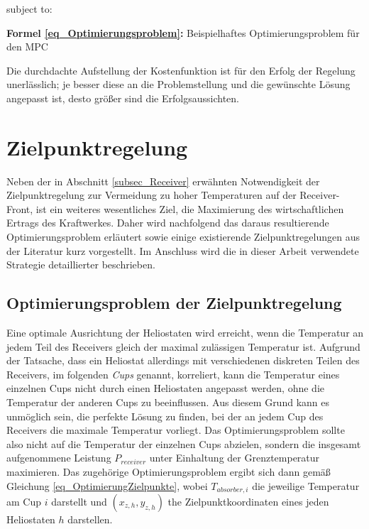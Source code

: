 \vspace*{-5.2\baselineskip}
\qquad subject to:
\vspace*{4.2\baselineskip}
\centerline{\small{\textsf{\textbf{Formel \ref{eq_Optimierungsproblem}:}} Beispielhaftes Optimierungsproblem für den MPC}}

Die durchdachte Aufstellung der Kostenfunktion ist für den Erfolg der Regelung unerlässlich; je besser diese an die Problemstellung und die gewünschte Lösung angepasst ist, desto größer sind die Erfolgsaussichten.


\section{Zielpunktregelung} \label{sec_Zielpunktregelung}
Neben der in Abschnitt \ref{subsec_Receiver} erwähnten Notwendigkeit der Zielpunktregelung zur Vermeidung zu hoher Temperaturen auf der Receiver-Front, ist ein weiteres wesentliches Ziel, die Maximierung des wirtschaftlichen Ertrags des Kraftwerkes.
Daher wird nachfolgend das daraus resultierende Optimierungsproblem erläutert sowie einige existierende Zielpunktregelungen aus der Literatur kurz vorgestellt.
Im Anschluss wird die in dieser Arbeit verwendete Strategie detaillierter beschrieben.

\subsection{Optimierungsproblem der Zielpunktregelung} \label{subsec_OptimierungZielpunkte}
Eine optimale Ausrichtung der Heliostaten wird erreicht, wenn die Temperatur an jedem Teil des Receivers gleich der maximal zulässigen Temperatur ist.
Aufgrund der Tatsache, dass ein Heliostat allerdings mit verschiedenen diskreten Teilen des Receivers, im folgenden \textit{Cups} genannt, korreliert, kann die Temperatur eines einzelnen Cups nicht durch einen Heliostaten angepasst werden, ohne die Temperatur der anderen Cups zu beeinflussen.
Aus diesem Grund kann es unmöglich sein, die perfekte Lösung zu finden, bei der an jedem Cup des Receivers die maximale Temperatur vorliegt.
Das Optimierungsproblem sollte also nicht auf die Temperatur der einzelnen Cups abzielen, sondern die insgesamt aufgenommene Leistung $P_{receiver}$ unter Einhaltung der Grenztemperatur maximieren.
Das zugehörige Optimierungsproblem ergibt sich dann gemäß Gleichung \ref{eq_OptimierungZielpunkte}, wobei $T_{absorber,i}$ die jeweilige Temperatur am Cup $i$ darstellt und $(x_{z,h}, y_{z,h})$ the Zielpunktkoordinaten eines jeden Heliostaten $h$ darstellen. \cite[S.15]{DissZanger}

